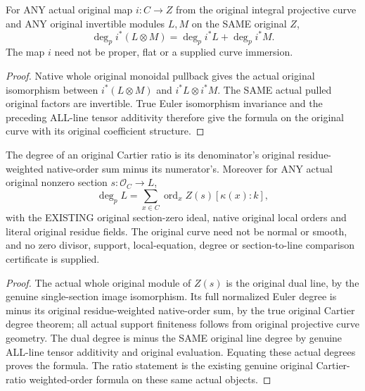 \begin{theorem}
\label{thm:fc-original-curve-line-degree-pullback-tensor}
\leanok
{}
For ANY actual original map $i:C\to Z$ from the original integral
projective curve and ANY original invertible modules $L,M$ on the SAME
original $Z$,
\[
 \deg_p i^*(L\otimes M)=\deg_p i^*L+\deg_p i^*M.
\]
The map $i$ need not be proper, flat or a supplied curve immersion.
\end{theorem}
\begin{proof}
Native whole original monoidal pullback gives the actual original
isomorphism between $i^*(L\otimes M)$ and $i^*L\otimes i^*M$.
The SAME actual pulled original factors are invertible. True Euler
isomorphism invariance and the preceding ALL-line tensor additivity
therefore give the formula on the original curve with its original
coefficient structure.
\end{proof}

\begin{theorem}
\label{thm:fc-original-curve-line-degree-zero-section}
\leanok
{}
The degree of an original Cartier ratio is its denominator's original
residue-weighted native-order sum minus its numerator's. Moreover for ANY
actual original nonzero section $s:\mathcal O_C\to L$,
\[
 \deg_p L=\sum_{x\in C}\operatorname{ord}_x Z(s)[\kappa(x):k],
\]
with the EXISTING original section-zero ideal, native original local
orders and literal original residue fields. The original curve need not
be normal or smooth, and no zero divisor, support, local-equation,
degree or section-to-line comparison certificate is supplied.
\end{theorem}
\begin{proof}
The actual whole original module of $Z(s)$ is the original dual line,
by the genuine single-section image isomorphism. Its full normalized
Euler degree is minus its original residue-weighted native-order sum,
by the true original Cartier degree theorem; all actual support finiteness
follows from original projective curve geometry. The dual degree is
minus the SAME original line degree by genuine ALL-line tensor additivity
and original evaluation. Equating these actual degrees proves the formula.
The ratio statement is the existing genuine original Cartier-ratio
weighted-order formula on these same actual objects.
\end{proof}
